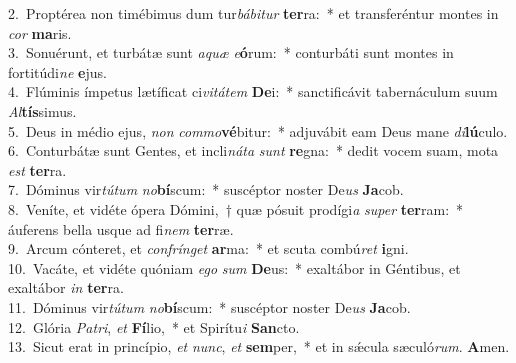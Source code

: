{2.~}Proptérea non timébimus dum tur\textit{bá}\textit{bi}\textit{tur} \textbf{ter}ra:~* et transferéntur montes in \textit{cor} \textbf{ma}ris.\\
{3.~}Sonuérunt, et turbátæ sunt \textit{a}\textit{quæ} \textit{e}\textbf{ó}rum:~* conturbáti sunt montes in fortitúdi\textit{ne} \textbf{e}jus.\\
{4.~}Flúminis ímpetus lætíficat ci\textit{vi}\textit{tá}\textit{tem} \textbf{De}i:~* sanctificávit tabernáculum suum \textit{Al}\textbf{tís}simus.\\
{5.~}Deus in médio ejus, \textit{non} \textit{com}\textit{mo}\textbf{vé}bitur:~* adjuvábit eam Deus mane \textit{di}\textbf{lú}culo.\\
{6.~}Conturbátæ sunt Gentes, et incli\textit{ná}\textit{ta} \textit{sunt} \textbf{re}gna:~* dedit vocem suam, mota \textit{est} \textbf{ter}ra.\\
{7.~}Dóminus vir\textit{tú}\textit{tum} \textit{no}\textbf{bí}scum:~* suscéptor noster De\textit{us} \textbf{Ja}cob.\\
{8.~}Veníte, et vidéte ópera Dómini,~† quæ pósuit prodígi\textit{a} \textit{su}\textit{per} \textbf{ter}ram:~* áuferens bella usque ad fi\textit{nem} \textbf{ter}ræ.\\
{9.~}Arcum cónteret, et \textit{con}\textit{frín}\textit{get} \textbf{ar}ma:~* et scuta combú\textit{ret} \textbf{i}gni.\\
{10.~}Vacáte, et vidéte quóniam \textit{e}\textit{go} \textit{sum} \textbf{De}us:~* exaltábor in Géntibus, et exaltábor \textit{in} \textbf{ter}ra.\\
{11.~}Dóminus vir\textit{tú}\textit{tum} \textit{no}\textbf{bí}scum:~* suscéptor noster De\textit{us} \textbf{Ja}cob.\\
{12.~}Glória \textit{Pa}\textit{tri}, \textit{et} \textbf{Fí}lio,~* et Spirítu\textit{i} \textbf{San}cto.\\
{13.~}Sicut erat in princípio, \textit{et} \textit{nunc}, \textit{et} \textbf{sem}per,~* et in sǽcula sæculó\textit{rum}. \textbf{A}men.\\
